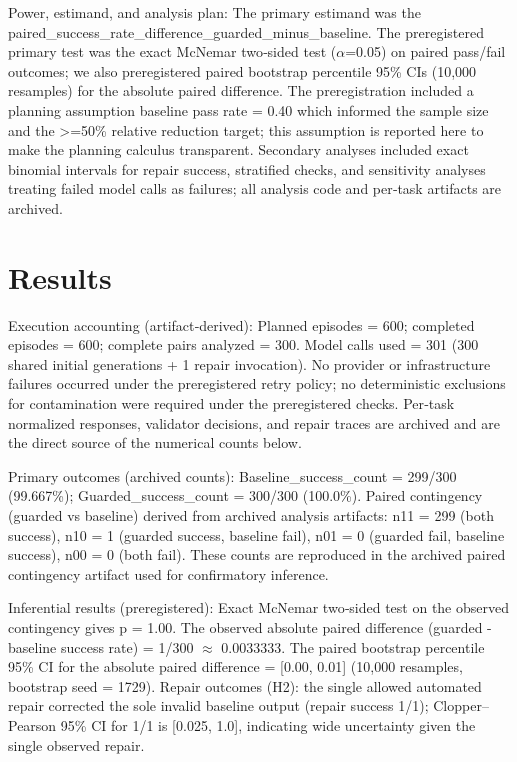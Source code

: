 \documentclass[conference]{IEEEtran}
\begin{document}
Power, estimand, and analysis plan: The primary estimand was the paired\_success\_rate\_difference\_guarded\_minus\_baseline. The preregistered primary test was the exact McNemar two‑sided test (\ensuremath{\alpha}=0.05) on paired pass/fail outcomes; we also preregistered paired bootstrap percentile 95\% CIs (10,000 resamples) for the absolute paired difference. The preregistration included a planning assumption baseline pass rate = 0.40 which informed the sample size and the >=50\% relative reduction target; this assumption is reported here to make the planning calculus transparent. Secondary analyses included exact binomial intervals for repair success, stratified checks, and sensitivity analyses treating failed model calls as failures; all analysis code and per‑task artifacts are archived.

\section{Results}
Execution accounting (artifact‑derived): Planned episodes = 600; completed episodes = 600; complete pairs analyzed = 300. Model calls used = 301 (300 shared initial generations + 1 repair invocation). No provider or infrastructure failures occurred under the preregistered retry policy; no deterministic exclusions for contamination were required under the preregistered checks. Per‑task normalized responses, validator decisions, and repair traces are archived and are the direct source of the numerical counts below.

Primary outcomes (archived counts): Baseline\_success\_count = 299/300 (99.667\%); Guarded\_success\_count = 300/300 (100.0\%). Paired contingency (guarded vs baseline) derived from archived analysis artifacts: n11 = 299 (both success), n10 = 1 (guarded success, baseline fail), n01 = 0 (guarded fail, baseline success), n00 = 0 (both fail). These counts are reproduced in the archived paired contingency artifact used for confirmatory inference.

Inferential results (preregistered): Exact McNemar two‑sided test on the observed contingency gives p = 1.00. The observed absolute paired difference (guarded - baseline success rate) = 1/300 \ensuremath{\approx} 0.0033333. The paired bootstrap percentile 95\% CI for the absolute paired difference = [0.00, 0.01] (10,000 resamples, bootstrap seed = 1729). Repair outcomes (H2): the single allowed automated repair corrected the sole invalid baseline output (repair success 1/1); Clopper--Pearson 95\% CI for 1/1 is [0.025, 1.0], indicating wide uncertainty given the single observed repair.
\end{document}
